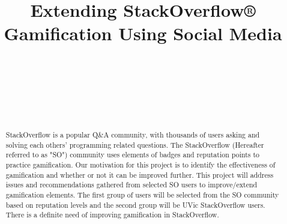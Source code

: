 \documentclass{sigchi}
\begin{document}
\title{Extending StackOverflow® Gamification Using Social Media}

\author{%
    \\
    \\
    \\
    \\
    \\
}

\maketitle

\begin{abstract}
StackOverflow is a popular Q\&A community, with thousands of users asking and solving each others' programming related questions. The StackOverflow (Hereafter referred to as "SO") community uses elements of badges and reputation points to
practice gamification. Our motivation for this project is to identify the
effectiveness of gamification and whether or not it can be improved further. This project
will address issues and recommendations gathered from selected SO users to
improve/extend gamification elements. The first group of users will be selected
from the SO community based on reputation levels and the second group will be UVic
StackOverflow users. There is a definite need of improving gamification in
StackOverflow.
\end{abstract}
\end{document}
